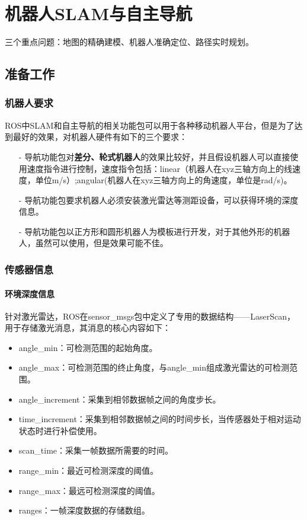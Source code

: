 \documentclass[9pt, oneside]{book}
\begin{document}
\chapter{机器人SLAM与自主导航}

三个重点问题：地图的精确建模、机器人准确定位、路径实时规划。

\section{准备工作}

\subsection{机器人要求}

ROS中SLAM和自主导航的相关功能包可以用于各种移动机器人平台，但是为了达到最好的效果，对机器人硬件有如下的三个要求：

\begin{itemize}
    \item[-] 导航功能包对\textbf{差分、轮式机器人}的效果比较好，并且假设机器人可以直接使用速度指令进行控制，速度指令包括：linear（机器人在xyz三轴方向上的线速度，单位m/s）;angular(机器人在xyz三轴方向上的角速度，单位是rad/s)。
    \item[-] 导航功能包要求机器人必须安装激光雷达等测距设备，可以获得环境的深度信息。
    \item[-] 导航功能包以正方形和圆形机器人为模板进行开发，对于其他外形的机器人，虽然可以使用，但是效果可能不佳。
\end{itemize}

\subsection{传感器信息}

\subsubsection{环境深度信息}

针对激光雷达，ROS在sensor\_msgs包中定义了专用的数据结构——LaserScan，用于存储激光消息，其消息的核心内容如下：

\begin{itemize}
    \item angle\_min：可检测范围的起始角度。
    \item angle\_max：可检测范围的终止角度，与angle\_min组成激光雷达的可检测范围。
    \item angle\_increment：采集到相邻数据帧之间的角度步长。
    \item time\_increment：采集到相邻数据帧之间的时间步长，\textcolor[rgb]{1,0,0}{当传感器处于相对运动状态时进行补偿使用。}
    \item scan\_time：采集一帧数据所需要的时间。
    \item range\_min：最近可检测深度的阈值。
    \item range\_max：最远可检测深度的阈值。
    \item ranges：一帧深度数据的存储数组。
\end{itemize}
\end{document}
